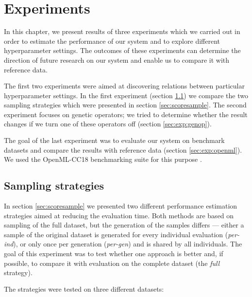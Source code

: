 \chapter{Experiments} \label{experiments}
In this chapter, we present results of three experiments which we carried out
in order to estimate the performance of our system and to explore different
hyperparameter settings. The outcomes of these experiments can determine the
direction of future research on our system and enable us to compare
it with reference data.

The first two experiments were aimed at discovering relations between
particular hyperparameter settings. In the first experiment
(section \ref{sec:exp:sample}) we compare the two
sampling strategies which were presented in section \ref{sec:scoresample}.
The second experiment focuses on genetic operators; we tried to determine
whether the result changes if we turn one of these operators off
(section \ref{sec:exp:genop}). 

The goal of the last experiment was to evaluate our system on benchmark
datasets and compare the results with reference data
(section \ref{sec:exp:openml}). We used the OpenML-CC18 benchmarking suite for
this purpose \citep{openmlcc18}.

\section{Sampling strategies} \label{sec:exp:sample}
In section \ref{sec:scoresample} we presented two different performance
estimation strategies aimed at reducing the evaluation time. Both methods
are based on sampling of the full dataset, but the generation of the samples
differs --- either a sample of the original dataset is generated for every
individual evaluation (\emph{per-ind}), or only once per generation
(\emph{per-gen}) and is shared by all individuals. The goal of this experiment
was to test whether one approach is better and, if possible, to compare it with
evaluation on the complete dataset (the \emph{full} strategy).

The strategies were tested on three different datasets:

